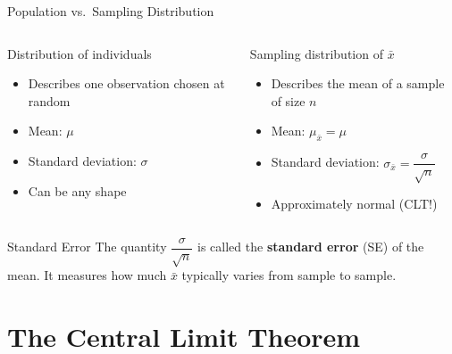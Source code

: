 \documentclass[aspectratio=169]{beamer}
\begin{document}
\begin{frame}{Population vs.\ Sampling Distribution}
    \begin{columns}
        \begin{exampleblock}{Distribution of individuals}
            \begin{itemize}
                \item Describes one observation chosen at random
                \item Mean: $\mu$
                \item Standard deviation: $\sigma$
                \item Can be any shape
            \end{itemize}
        \end{exampleblock}
        \begin{alertblock}{Sampling distribution of $\bar{x}$}
            \begin{itemize}
                \item Describes the mean of a sample of size $n$
                \item Mean: $\mu_{\bar{x}} = \mu$
                \item Standard deviation: $\sigma_{\bar{x}} = \dfrac{\sigma}{\sqrt{n}}$
                \item Approximately normal (CLT!)
            \end{itemize}
        \end{alertblock}
    \end{columns}
    \bigskip
    \begin{block}{Standard Error}
        The quantity $\dfrac{\sigma}{\sqrt{n}}$ is called the \textbf{standard error} (SE) of the mean.
        It measures how much $\bar{x}$ typically varies from sample to sample.
    \end{block}
\end{frame}

\section{The Central Limit Theorem}
\end{document}
